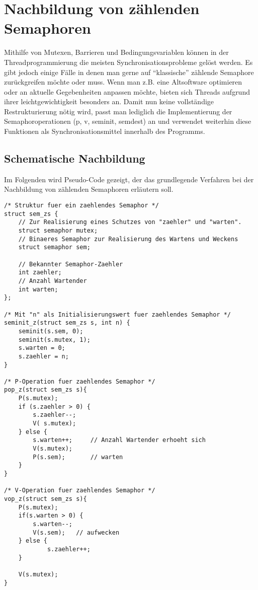 \documentclass[11pt,a4paper]{article}
\begin{document}
\section{Nachbildung von zählenden Semaphoren}
Mithilfe von Mutexen, Barrieren und Bedingungsvariablen können in der Threadprogrammierung die meisten Synchronisationsprobleme
gelöst werden. Es gibt jedoch einige Fälle in denen man gerne auf ``klassische'' zählende Semaphore zurückgreifen möchte oder muss.
Wenn man z.B. eine Altsoftware optimieren oder an aktuelle Gegebenheiten anpassen möchte, bieten sich Threads aufgrund ihrer 
leichtgewichtigkeit besonders an. Damit nun keine vollständige Restrukturierung nötig wird, passt man lediglich die Implementierung
der Semaphoroperationen (p, v, seminit, semdest) an und verwendet weiterhin diese Funktionen als Synchronisationsmittel innerhalb
des Programms.

\subsection{Schematische Nachbildung}
Im Folgenden wird Pseudo-Code gezeigt, der das grundlegende Verfahren bei der
Nachbildung von zählenden Semaphoren erläutern soll.

\begin{lstlisting}
/* Struktur fuer ein zaehlendes Semaphor */
struct sem_zs {
	// Zur Realisierung eines Schutzes von "zaehler" und "warten".
   	struct semaphor mutex;
	// Binaeres Semaphor zur Realisierung des Wartens und Weckens
   	struct semaphor sem; 
   	
	// Bekannter Semaphor-Zaehler
	int zaehler;
	// Anzahl Wartender
   	int warten;	
};

/* Mit "n" als Initialisierungswert fuer zaehlendes Semaphor */
seminit_z(struct sem_zs s, int n) {   
   	seminit(s.sem, 0);
   	seminit(s.mutex, 1);
   	s.warten = 0;
   	s.zaehler = n;
}

/* P-Operation fuer zaehlendes Semaphor */
pop_z(struct sem_zs s){		
   	P(s.mutex);
   	if (s.zaehler > 0) {
      	s.zaehler--; 
		V( s.mutex);
   	} else {
      	s.warten++; 	// Anzahl Wartender erhoeht sich
      	V(s.mutex);
      	P(s.sem);		// warten
   	}
}

/* V-Operation fuer zaehlendes Semaphor */
vop_z(struct sem_zs s){
   	P(s.mutex);
   	if(s.warten > 0) {
      	s.warten--; 
      	V(s.sem);	// aufwecken
  	} else {
     		s.zaehler++;
   	}

   	V(s.mutex);
}
\end{lstlisting}
\end{document}
